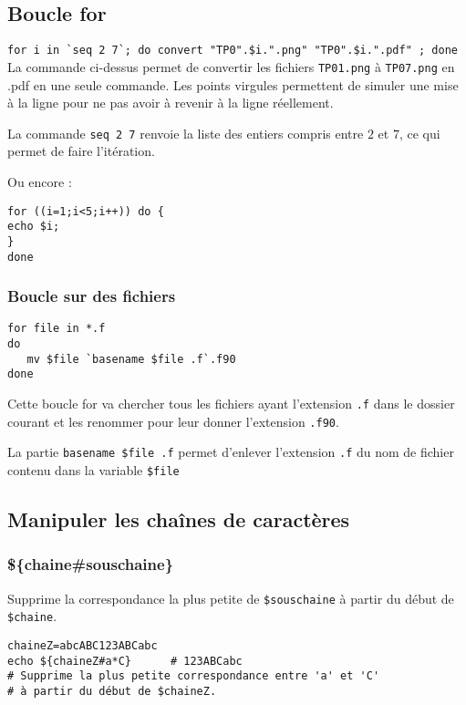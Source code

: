 \documentclass[a4paper,twoside]{article}
\begin{document}
\subsection{Boucle for}
\verb|for i in `seq 2 7`; do convert "TP0".$i.".png" "TP0".$i.".pdf" ; done|\\
La commande ci-dessus permet de convertir les fichiers \texttt{TP01.png} à \texttt{TP07.png} en .pdf en une seule commande. Les points virgules permettent de simuler une mise à la ligne pour ne pas avoir à revenir à la ligne réellement.

La commande \texttt{seq 2 7} renvoie la liste des entiers compris entre $2$ et $7$, ce qui permet de faire l'itération.

Ou encore :

\begin{exemple}
\begin{verbatim}
for ((i=1;i<5;i++)) do {
echo $i;
}
done
\end{verbatim}
\end{exemple}

\subsubsection{Boucle sur des fichiers}
\begin{verbatim}
for file in *.f
do
   mv $file `basename $file .f`.f90
done
\end{verbatim}

Cette boucle for va chercher tous les fichiers ayant l'extension \texttt{.f} dans le dossier courant et les renommer pour leur donner l'extension \texttt{.f90}.

\begin{remarque}
La partie \verb|basename $file .f| permet d'enlever l'extension \texttt{.f} du nom de fichier contenu dans la variable \verb|$file|
\end{remarque}


\subsection{Manipuler les chaînes de caractères}
\subsubsection{\$\{chaine\#souschaine\}}
Supprime la correspondance la plus petite de \verb|$souschaine| à partir du début de \verb|$chaine|.

\begin{exemple}
\begin{verbatim}
chaineZ=abcABC123ABCabc
echo ${chaineZ#a*C}      # 123ABCabc
# Supprime la plus petite correspondance entre 'a' et 'C'
# à partir du début de $chaineZ.
\end{verbatim}
\end{exemple}
\end{document}
